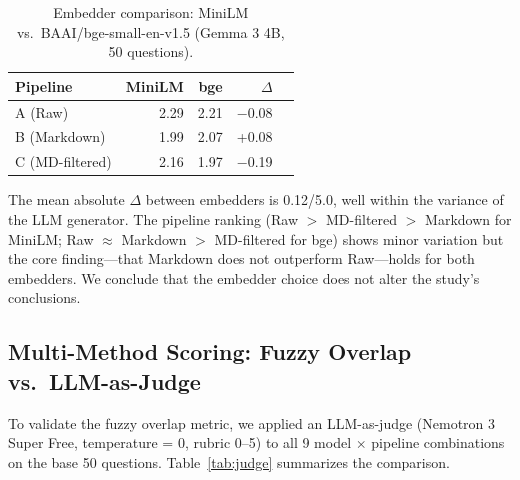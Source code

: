 \documentclass{article}
\begin{document}
\begin{table}[t]
    \centering
    \caption{Embedder comparison: MiniLM vs.\ BAAI/bge-small-en-v1.5 (Gemma 3 4B, 50 questions).}
    \label{tab:embedder}
    \begin{tabular}{lrrrr}
        \toprule
        Pipeline & MiniLM & bge & $\Delta$ & \\
        \midrule
        A (Raw)             & 2.29 & 2.21 & $-$0.08 \\
        B (Markdown)        & 1.99 & 2.07 & +0.08 \\
        C (MD-filtered)     & 2.16 & 1.97 & $-$0.19 \\
        \bottomrule
    \end{tabular}
\end{table}

The mean absolute $\Delta$ between embedders is 0.12/5.0, well within the variance of the LLM generator. The pipeline ranking (Raw $>$ MD-filtered $>$ Markdown for MiniLM; Raw $\approx$ Markdown $>$ MD-filtered for bge) shows minor variation but the core finding---that Markdown does not outperform Raw---holds for both embedders. We conclude that the embedder choice does not alter the study's conclusions.

\subsection{Multi-Method Scoring: Fuzzy Overlap vs.\ LLM-as-Judge}

To validate the fuzzy overlap metric, we applied an LLM-as-judge (Nemotron 3 Super Free, temperature = 0, rubric 0--5) to all 9 model $\times$ pipeline combinations on the base 50 questions. Table~\ref{tab:judge} summarizes the comparison.
\end{document}

